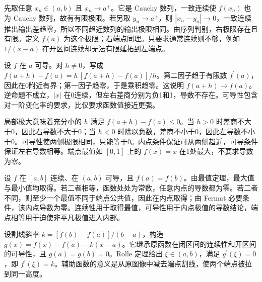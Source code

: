 \documentclass[UTF8,12pt,a4paper,fontset=fandol]{ctexart}
\begin{document}
\begin{solve}\label{ans:c7q6}
先取任意 $x_n\in(a,b)$ 且 $x_n\to a^+$。它是 Cauchy 数列，一致连续使 $f(x_n)$ 也为 Cauchy 数列，故有有限极限。若另取 $y_n\to a^+$，则 $|x_n-y_n|\to0$，一致连续推出输出差趋零，所以不同趋近数列的输出极限相同。由序列判别，右极限存在且有限。定义 $f(a)$ 为这个极限；右端点同理。只要求通常连续则不够，例如 $1/(x-a)$ 在开区间连续却无法有限延拓到左端点。
\end{solve}

\begin{solve}\label{ans:c7q7}
设 $f$ 在 $a$ 可导。对 $h\ne0$，写成 $f(a+h)-f(a)=h\,[f(a+h)-f(a)]/h$。第二因子趋于有限数 $f^{\prime}(a)$，因此在0附近有界；第一因子趋零，于是乘积趋零。这说明 $f(a+h)\to f(a)$。逆命题不成立，$|x|$ 在0连续，但左右差商分别为负1和1，导数不存在。可导性包含对一阶变化率的要求，比仅要求函数值接近更强。
\end{solve}

\begin{solve}\label{ans:c7q8}
局部极大意味着充分小的 $h$ 满足 $f(a+h)-f(a)\le0$。当 $h>0$ 时差商不大于0，因此右导数不大于0；当 $h<0$ 时除以负数，差商不小于0，因此左导数不小于0。可导性使两侧极限相同，只能等于0。内点条件保证可从两侧趋近，可导条件保证左右导数相等。端点最值如 $[0,1]$ 上的 $f(x)=x$ 在1处最大，不要求导数为零。
\end{solve}

\begin{solve}\label{ans:c7q9}
设 $f$ 在 $[a,b]$ 连续、在 $(a,b)$ 可导，且 $f(a)=f(b)$。由最值定理，最大值与最小值均取得。若二者相等，函数处处为常数，任意内点的导数都为零。若二者不同，则至少一个最值不同于端点公共值，因此在内点取得；由 Fermat 必要条件，该内点导数为零。连续性用于取得最值，可导性用于内点极值的导数结论，端点相等用于迫使非平凡极值进入内部。
\end{solve}

\begin{solve}\label{ans:c7q10}
设割线斜率 $k=[f(b)-f(a)]/(b-a)$，构造 $g(x)=f(x)-f(a)-k(x-a)$。它继承原函数在闭区间的连续性和开区间的可导性，且 $g(a)=g(b)=0$。Rolle 定理给出 $\xi\in(a,b)$，满足 $g^{\prime}(\xi)=0$，即 $f^{\prime}(\xi)=k$。辅助函数的意义是从原图像中减去端点割线，使两个端点被拉到同一高度。
\end{solve}
\end{document}
